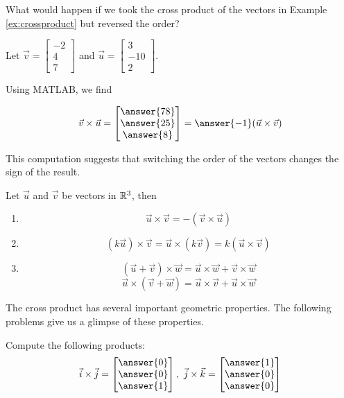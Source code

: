 \documentclass{ximera}
\begin{document}
\begin{exploration}\label{init:crossproduct2}
What would happen if we took the cross product of the vectors in Example \ref{ex:crossproduct} but reversed the order?
 
Let $\vec{v}=\begin{bmatrix}-2\\ 4\\ 7\end{bmatrix}$ and $\vec{u}=\begin{bmatrix}3\\ -10\\ 2\end{bmatrix}$.

Using MATLAB, we find 

$$
\vec{v}\times \vec{u}
=\begin{bmatrix}\answer{78}\\ \answer{25}\\ \answer{8}\end{bmatrix}=\answer{-1}(\vec{u}\times\vec{v})$$
 
This computation suggests that switching the order of the vectors changes the sign of the result.
\end{exploration}
 
\begin{theorem}\label{th:corssuvnegcrossvu}
Let $\vec{u}$ and $\vec{v}$ be vectors in $\mathbb{R}^3$, then
\begin{enumerate}
\item $$\vec{u}\times\vec{v}=-(\vec{v}\times\vec{u})$$
\item\label{item:scalarassocofcrossprod} 
$$(k\vec{u})\times \vec{v}=\vec{u}\times (k\vec{v})=k(\vec{u}\times \vec{v})$$
\item\label{item:distofrossprod} 
$$(\vec{u}+\vec{v})\times \vec{w}=\vec{u}\times \vec{w}+\vec{v}\times \vec{w}$$
$$\vec{u}\times (\vec{v}+\vec{w})=\vec{u}\times \vec{v}+\vec{u}\times \vec{w}$$
\end{enumerate}
\end{theorem}
 
The cross product has several important geometric properties. The following problems give us a glimpse of these properties.
 
\begin{exploration}\label{init:ijkcrossproducts}
Compute the following products:
$$\vec{i}\times\vec{j}=\begin{bmatrix}\answer{0}\\\answer{0}\\\answer{1}\end{bmatrix},\quad\vec{j}\times\vec{k}=\begin{bmatrix}\answer{1}\\\answer{0}\\\answer{0}\end{bmatrix}$$
 
\end{exploration}
 
\end{document}
